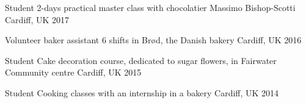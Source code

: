 


\begin{cvhonors}

  \cvhonor
    {Student} %
    {2-days practical master class with chocolatier Massimo Bishop-Scotti} %
    {Cardiff, UK} %
    {2017}

  \cvhonor
    {Volunteer baker assistant} %
    {6 shifts in Brød, the Danish bakery} %
    {Cardiff, UK} %
    {2016} %

  \cvhonor
    {Student} %
    {Cake decoration course, dedicated to sugar flowers, in Fairwater Community centre} %
    {Cardiff, UK} %
    {2015} %

  \cvhonor
    {Student} %
    {Cooking classes with an internship in a bakery} %
    {Cardiff, UK} %
    {2014} %

\end{cvhonors}

